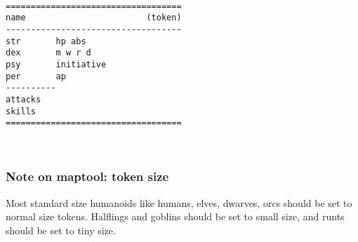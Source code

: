 \

\goodbreak \begin{samepage} \small \begin{verbatim}
===================================
name                        (token)
-----------------------------------
str       hp abs
dex       m w r d
psy       initiative
per       ap
----------
attacks
skills
===================================
\end{verbatim} \normalsize \end{samepage}

\






\subsubsection*{Note on maptool: token size}
Most standard size humanoids like humans, elves, dwarves, orcs should be set to  normal size tokens. Halflings and goblins should be set to small size, and runts should be set to tiny size.

\






\goodbreak
{}

